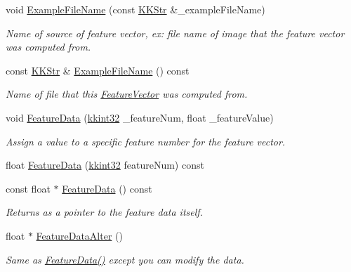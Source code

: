 \begin{DoxyCompactItemize}
\item 
void \hyperlink{class_k_k_m_l_l_1_1_feature_vector_ab47c89ab1e9396664fdc0dc34b6e1ab5}{Example\+File\+Name} (const \hyperlink{class_k_k_b_1_1_k_k_str}{K\+K\+Str} \&\+\_\+example\+File\+Name)
\begin{DoxyCompactList}\small\item\em Name of source of feature vector, ex\+: file name of image that the feature vector was computed from. \end{DoxyCompactList}\item 
const \hyperlink{class_k_k_b_1_1_k_k_str}{K\+K\+Str} \& \hyperlink{class_k_k_m_l_l_1_1_feature_vector_a35dc54262db6b58ebf5e1341038f66b1}{Example\+File\+Name} () const 
\begin{DoxyCompactList}\small\item\em Name of file that this \hyperlink{class_k_k_m_l_l_1_1_feature_vector}{Feature\+Vector} was computed from. \end{DoxyCompactList}\item 
void \hyperlink{class_k_k_m_l_l_1_1_feature_vector_af055b7c725a4d80a31cd2f6606cc37b6}{Feature\+Data} (\hyperlink{namespace_k_k_b_a8fa4952cc84fda1de4bec1fbdd8d5b1b}{kkint32} \+\_\+feature\+Num, float \+\_\+feature\+Value)
\begin{DoxyCompactList}\small\item\em Assign a value to a specific feature number for the feature vector. \end{DoxyCompactList}\item 
float \hyperlink{class_k_k_m_l_l_1_1_feature_vector_a0af4516aa29f0485e1c2167dd46e67bd}{Feature\+Data} (\hyperlink{namespace_k_k_b_a8fa4952cc84fda1de4bec1fbdd8d5b1b}{kkint32} feature\+Num) const 
\item 
const float $\ast$ \hyperlink{class_k_k_m_l_l_1_1_feature_vector_a7927de13dd706f5c574e9956f963f4df}{Feature\+Data} () const 
\begin{DoxyCompactList}\small\item\em Returns as a pointer to the feature data itself. \end{DoxyCompactList}\item 
float $\ast$ \hyperlink{class_k_k_m_l_l_1_1_feature_vector_a1de79e775d2bb2ddde4016a1269b5431}{Feature\+Data\+Alter} ()
\begin{DoxyCompactList}\small\item\em Same as \textquotesingle{}\hyperlink{class_k_k_m_l_l_1_1_feature_vector_af055b7c725a4d80a31cd2f6606cc37b6}{Feature\+Data()} except you can modify the data. \end{DoxyCompactList}\item 

\end{DoxyCompactItemize}
